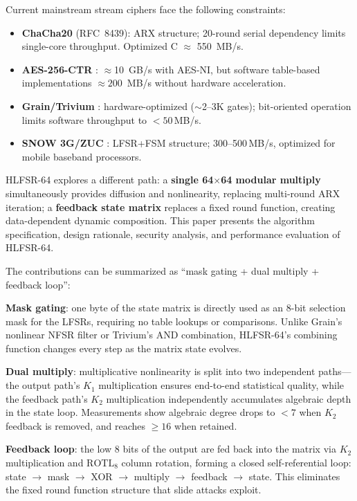 \documentclass[11pt,a4paper]{article}
\begin{document}
Current mainstream stream ciphers face the following constraints:

\begin{itemize}
\item \textbf{ChaCha20} \cite{chacha} (RFC~8439): ARX structure; 20-round serial
  dependency limits single-core throughput. Optimized C $\approx$ 550~MB/s.
\item \textbf{AES-256-CTR} \cite{gcm}: $\approx$10~GB/s with AES-NI, but software
  table-based implementations $\approx 200$~MB/s without hardware acceleration.
\item \textbf{Grain/Trivium} \cite{grain,trivium}: hardware-optimized
  ($\sim$2--3K gates); bit-oriented operation limits software throughput to
  $<50$\,MB/s.
\item \textbf{SNOW 3G/ZUC} \cite{etsi-snow}: LFSR+FSM structure;
  300--500\,MB/s, optimized for mobile baseband processors.
\end{itemize}

HLFSR-64 explores a different path: a \textbf{single 64$\times$64 modular
multiply} simultaneously provides diffusion and nonlinearity, replacing
multi-round ARX iteration; a \textbf{feedback state matrix} replaces a fixed
round function, creating data-dependent dynamic composition. This paper
presents the algorithm specification, design rationale, security analysis, and
performance evaluation of HLFSR-64.

The contributions can be summarized as ``mask gating + dual multiply + feedback
loop'':

\textbf{Mask gating}: one byte of the state matrix is directly used as an 8-bit
selection mask for the LFSRs, requiring no table lookups or comparisons. Unlike
Grain's nonlinear NFSR filter or Trivium's AND combination, HLFSR-64's
combining function changes every step as the matrix state evolves.

\textbf{Dual multiply}: multiplicative nonlinearity is split into two
independent paths---the output path's $K_1$ multiplication ensures end-to-end
statistical quality, while the feedback path's $K_2$ multiplication
independently accumulates algebraic depth in the state loop. Measurements show
algebraic degree drops to $<7$ when $K_2$ feedback is removed, and reaches
$\ge 16$ when retained.

\textbf{Feedback loop}: the low 8 bits of the output are fed back into the
matrix via $K_2$ multiplication and $\mathrm{ROTL}_8$ column rotation, forming a
closed self-referential loop: state $\to$ mask $\to$ XOR $\to$ multiply $\to$
feedback $\to$ state. This eliminates the fixed round function structure that
slide attacks exploit.
\end{document}
